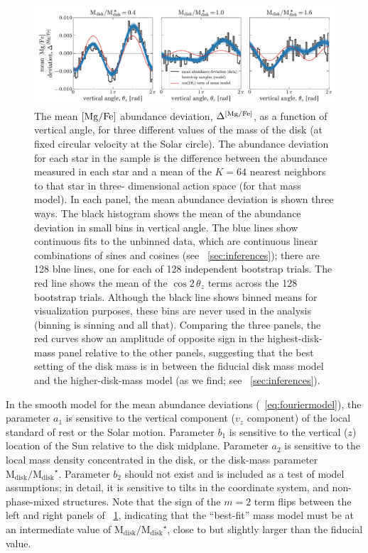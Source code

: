 \documentclass[modern]{aastex63}
\newcommand{\mdisk}{\ensuremath{\mathrm{M}_\mathrm{disk}}}
\newcommand{\mratio}{\ensuremath{\mdisk / \mdisk^\star}}
\begin{document}
\begin{figure}[!tp] %
  \begin{mdframed}
  \begin{center}
  \includegraphics[width=\textwidth]{sinusoid-fits.pdf}
  \end{center}
  \caption{%
    The mean ${[\mathrm{Mg}/\mathrm{Fe}]}$ abundance deviation, $\Delta^{{[\mathrm{Mg}/\mathrm{Fe}]}}$, as a
    function of vertical angle, for three different values of the mass of the
    disk (at fixed circular velocity at the Solar circle).
    The abundance deviation for each star in the sample is the difference
    between the abundance measured in each star and a mean of the $K=64$ nearest
    neighbors to that star in three- dimensional action space (for that mass
    model).
    In each panel, the mean abundance deviation is shown three ways.
    The black histogram shows the mean of the abundance deviation in small bins
    in vertical angle.
    The blue lines show continuous fits to the unbinned data, which are
    continuous linear combinations of sines and cosines (see
    \sectionname~\ref{sec:inferences}); there are 128 blue lines, one for each
    of 128 independent bootstrap trials.
    The red line shows the mean of the $\cos 2\,\theta_z$ terms across the
    128 bootstrap trials.
    Although the black line shows binned means for visualization purposes,
    these bins are never used in the analysis (binning is sinning and all that).
    Comparing the three panels, the red curves show an amplitude of opposite
    sign in the highest-disk-mass panel relative to the other panels, suggesting
    that the best setting of the disk mass is in between the fiducial disk mass
    model and the higher-disk-mass model (as we find; see
    \sectionname~\ref{sec:inferences}).
  \label{fig:sinusoid-fits}
  }
  \end{mdframed}
\end{figure}

In the smooth model for the mean abundance deviations
(\equationname~\ref{eq:fouriermodel}), the parameter $a_1$ is sensitive to the
vertical component ($v_z$ component) of the local standard of rest or the Solar
motion.
Parameter $b_1$ is sensitive to the vertical ($z$) location of the Sun relative
to the disk midplane.
Parameter $a_2$ is sensitive to the local mass density concentrated in the disk,
or the disk-mass parameter \mratio.
Parameter $b_2$ should not exist and is included as a test of model assumptions;
in detail, it is sensitive to tilts in the coordinate system, and
non-phase-mixed structures.
Note that the sign of the $m=2$ term flips between the left and right panels of
\figurename~\ref{fig:sinusoid-fits}, indicating that the ``best-fit'' mass model
must be at an intermediate value of $\mratio$, close to but slightly larger than
the fiducial value.
\end{document}
